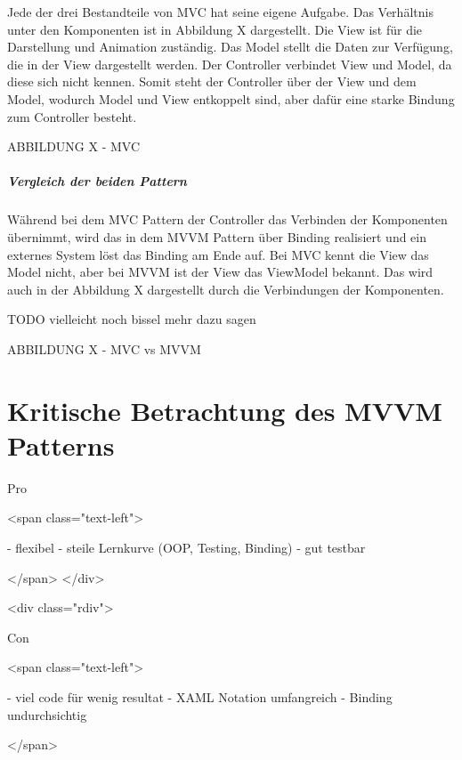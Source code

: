 \documentclass[titlepage=false,12pt]{scrreprt}
\begin{document}
Jede der drei Bestandteile von MVC hat seine eigene Aufgabe. Das Verhältnis unter den Komponenten
ist in Abbildung X dargestellt. Die View ist für die Darstellung und
Animation zuständig. Das Model stellt die Daten zur Verfügung, die in der View dargestellt werden.
Der Controller verbindet View und Model, da diese sich nicht kennen. Somit steht der Controller 
über der View und dem Model, wodurch Model und View entkoppelt sind, aber dafür eine starke Bindung
zum Controller besteht. 

ABBILDUNG X - MVC

\paragraph{Vergleich der beiden Pattern}

Während bei dem MVC Pattern der Controller das Verbinden der Komponenten übernimmt, wird das
in dem MVVM Pattern über Binding realisiert und ein externes System löst das Binding am Ende auf.
Bei MVC kennt die View das Model nicht, aber bei MVVM ist der View das ViewModel bekannt.
Das wird auch in der Abbildung X dargestellt durch die Verbindungen der Komponenten.

TODO vielleicht noch bissel mehr dazu sagen

ABBILDUNG X - MVC vs MVVM

\chapter{Kritische Betrachtung des MVVM Patterns}



Pro

<span class="text-left">

- flexibel
- steile Lernkurve (OOP, Testing, Binding)
- gut testbar

</span>
</div>

<div class="rdiv">

Con

<span class="text-left">

- viel code für wenig resultat
- XAML Notation umfangreich
- Binding undurchsichtig

</span>
\end{document}
